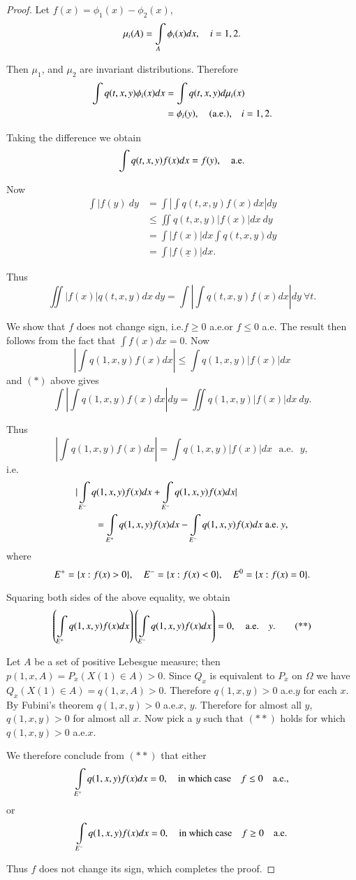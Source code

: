 \begin{proof}
Let $f(x)=\phi_{1}(x)-\phi_{2}(x)$,
$$
\mu_{i}(A)=\int\limits_{A}\phi_{i}(x)dx,\quad i=1,2.
$$

Then $\mu_{1}$, and $\mu_{2}$ are invariant distributions. Therefore
\begin{align*}
\int q(t,x,y)\phi_{i}(x)dx &= \int q(t,x,y)d\mu_{i}(x)\\
&= \phi_{i}(y),\quad\text{(a.e.),}\quad i=1,2.
\end{align*}

Taking the difference we obtain
$$
\int q(t,x,y)f(x)dx=f(y),\quad\text{a.e.}
$$

Now 
\begin{align*}
\int |f(y)\ dy &= \int|\int q(t,x,y)f(x)dx|dy\\
&\leq \iint q(t,x,y)|f(x)|dx\ dy\\
&= \int |f(x)|dx\int q(t,x,y)dy\\
&= \int |f(\underline{x})|dx.
\end{align*}\pageoriginale

Thus
\begin{equation*}
\iint |f(x)|q(t,x,y)dx\ dy=\int|\int q(t,x,y)f(x)dx|dy\ \forall t.\tag{*}
\end{equation*}

We show that $f$ does not change sign, i.e.\@ $f\geq 0$ a.e.\@ or
$f\leq 0$ a.e. The result then follows from the fact that $\int
f(x)dx=0$. Now
$$
|\int q(1,x,y)f(x)dx|\leq \int q(1,x,y)|f(x)|dx
$$
and $(*)$ above gives
$$
\int|\int q(1,x,y)f(x)dx|dy=\iint q(1,x,y)|f(x)|dx\ dy.
$$

Thus
$$
|\int q(1,x,y)f(x)dx|=\int q(1,x,y)|f(x)|dx\text{~ a.e.~ } y,
$$
i.e.
\begin{align*}
& |\int\limits_{E^{-}}q(1,x,y)f(x)dx+\int\limits_{E^{-}}q(1,x,y)f(x)dx|\\
&\qquad
  =\int\limits_{E^{+}}q(1,x,y)f(x)dx-\int\limits_{E^{-}}q(1,x,y)f(x)dx\text{~
    a.e.~ } y,
\end{align*}
where
$$
E^{+}=\{x:f(x)>0\},\quad E^{-}=\{x:f(x)<0\},\quad E^{0}=\{x:f(x)=0\}.
$$

Squaring both sides of the above equality, we obtain
\begin{equation*}
\left(\int\limits_{E^{+}}q(1,x,y)f(x)dx\right)\left(\int\limits_{E^{-}}q(1,x,y)f(x)dx\right)=0,\quad\text{a.e.}\quad y.\tag{**}
\end{equation*}\pageoriginale

Let $A$ be a set of positive Lebesgue measure; then
$p(1,x,A)=P_{x}(X(1)\in A)>0$. Since $Q_{x}$ is equivalent to $P_{x}$
on $\Omega$ we have $Q_{x}(X(1)\in A)=q(1,x,A)>0$. Therefore
$q(1,x,y)>0$ a.e.\@ $y$ for each $x$. By Fubini's theorem $q(1,x,y)>0$
a.e.\@ $x$, $y$. Therefore for almost all $y$, $q(1,x,y)>0$ for almost
all $x$. Now pick a $y$ such that $(**)$ holds for which $q(1,x,y)>0$
a.e.\@ $x$.

We therefore conclude from $(**)$ that either
$$
\int\limits_{E^{+}}q(1,x,y)f(x)dx=0,\quad \text{in which case}\quad f\leq
0\quad \text{a.e.,}
$$
or
$$
\int\limits_{E^{-}}q(1,x,y)f(x)dx=0,\quad \text{in which case}\quad f\geq
0\quad\text{a.e.} 
$$

Thus $f$ does not change its sign, which completes the proof.
\end{proof}


